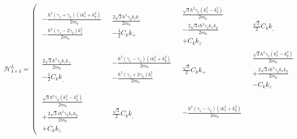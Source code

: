 \begin{align}
\mathcal{H}_{4\times4}^{L} =\left(
 \begin{array}{c|c|c|c}
\begin{array}{c}
-\frac{\hbar^2(\gamma_1 +\gamma_2)(ik_x^2 +k_y^2)}{2m_0}\\
-\frac{\hbar^2(\gamma_1-2\gamma_2)k_z^2}{2m_0} 
\end{array}
&\begin{array}{c}
 \frac{2\sqrt{3}\hbar^2\gamma_3k_zk_\_}{2m_0} \\
-\frac{1}{2}C_kk_+
\end{array}
&\begin{array}{c}
\frac{\sqrt{3}\hbar^2\gamma_2(k_x^2 -k_y^2)}{2m_0} \\
-\frac{2\sqrt{3}i\hbar^2\gamma_3k_xk_y}{2m_0}\\
+C_kk_z
\end{array}
&\begin{array}{c}
\frac{\sqrt{3}}{2}C_kk_\_
\end{array}
\\ \hline
\begin{array}{c}
\frac{2\sqrt{3}\hbar^2\gamma_3k_zk_+}{2m_0} \\
-\frac{1}{2}C_kk_\_
\end{array}
&\begin{array}{c}
 -\frac{\hbar^2(\gamma_1 -\gamma_2)(ik_x^2 +k_y^2)}{2m_0}\\
-\frac{\hbar^2(\gamma_1 +2\gamma_2)k_z^2}{2m_0} 
\end{array}
&\begin{array}{c}
\frac{\sqrt{3}}{2}C_kk_+
\end{array}
&\begin{array}{c}
\frac{\sqrt{3}\hbar^2\gamma_2(k_x^2 -k_y^2)}{2m_0} \\
+\frac{2\sqrt{3}i\hbar^2\gamma_3k_xk_y}{2m_0}\\
-C_kk_z
\end{array}
\\ \hline
\begin{array}{c}
\frac{\sqrt{3}\hbar^2\gamma_2(k_x^2 -k_y^2)}{2m_0} \\
+\frac{2\sqrt{3}i\hbar^2\gamma_3k_xk_y}{2m_0}\\
+C_kk_z
\end{array}
&\begin{array}{c}
\frac{\sqrt{3}}{2}C_kk_\_
\end{array}
&\begin{array}{c}
-\frac{\hbar^2(\gamma_1-\gamma_2)(ik_x^2 +k_y^2)}{2m_0}\\

\end{array}
\end{array}
\end{align}
